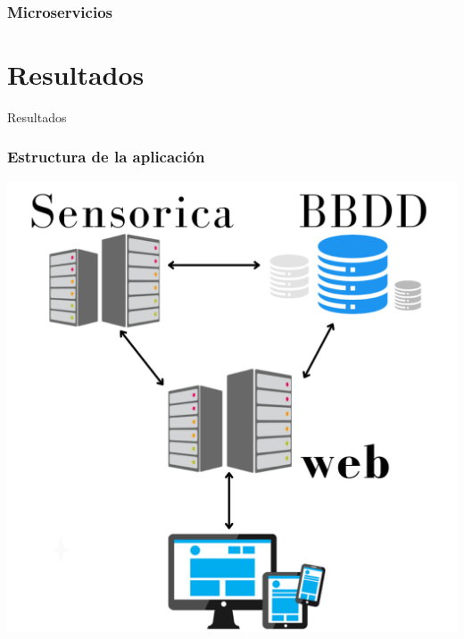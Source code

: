\documentclass{beamer}
\begin{document}
\begin{frame}
    \frametitle{Microservicios}
\end{frame}

\section{Resultados}
\begin{frame}
   \huge
    Resultados
\end{frame}

\begin{frame}
    \frametitle{Estructura de la aplicación}
    \begin{table}
        \includegraphics[width=0.6\linewidth]{../images/diapositivas/sistema.png}
    \end{table}
\end{frame}
\end{document}
